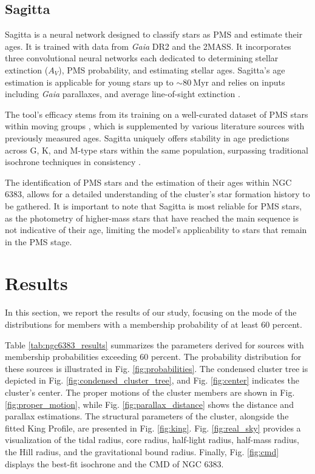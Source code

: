 \documentclass{aa}
\begin{document}
\subsection{Sagitta}
Sagitta is a neural network designed to classify stars as PMS and estimate their ages. It is trained with data from \textit{Gaia} DR2 and the 2MASS. It incorporates three convolutional neural networks each dedicated to determining stellar extinction ($A_V$), PMS probability, and estimating stellar ages. Sagitta's age estimation is applicable for young stars up to $\sim 80~\mathrm{Myr}$ and relies on inputs including \textit{Gaia} parallaxes, and average line-of-sight extinction \citep{2021AJ....162..282M}.

The tool's efficacy stems from its training on a well-curated dataset of PMS stars within moving groups \citep{2020AJ....160..279K}, which is supplemented by various literature sources with previously measured ages. Sagitta uniquely offers stability in age predictions across G, K, and M-type stars within the same population, surpassing traditional isochrone techniques in consistency \citep{2023AJ....165..182K}.

The identification of PMS stars and the estimation of their ages within NGC 6383, allows for a detailed understanding of the cluster's star formation history to be gathered. It is important to note that Sagitta is most reliable for PMS stars, as the photometry of higher-mass stars that have reached the main sequence is not indicative of their age, limiting the model's applicability to stars that remain in the PMS stage.

\section{Results}\label{sec:results}
In this section, we report the results of our study, focusing on the mode of the distributions for members with a membership probability of at least $60$ percent.

Table \ref{tab:ngc6383_results} summarizes the parameters derived for sources with membership probabilities exceeding $60$ percent. The probability distribution for these sources is illustrated in Fig. \ref{fig:probabilities}. The condensed cluster tree is depicted in Fig. \ref{fig:condensed_cluster_tree}, and Fig. \ref{fig:center} indicates the cluster's center. The proper motions of the cluster members are shown in Fig. \ref{fig:proper_motion}, while Fig. \ref{fig:parallax_distance} shows the distance and parallax estimations. The structural parameters of the cluster, alongside the fitted King Profile, are presented in Fig. \ref{fig:king}. Fig. \ref{fig:real_sky} provides a visualization of the tidal radius, core radius, half-light radius, half-mass radius, the Hill radius, and the gravitational bound radius. Finally, Fig. \ref{fig:cmd} displays the best-fit isochrone and the CMD of NGC 6383.
\end{document}
